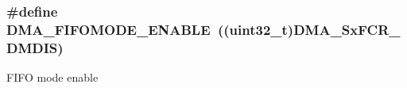 \subsubsection[{\texorpdfstring{D\+M\+A\+\_\+\+F\+I\+F\+O\+M\+O\+D\+E\+\_\+\+E\+N\+A\+B\+LE}{DMA_FIFOMODE_ENABLE}}]{\setlength{\rightskip}{0pt plus 5cm}\#define D\+M\+A\+\_\+\+F\+I\+F\+O\+M\+O\+D\+E\+\_\+\+E\+N\+A\+B\+LE~((uint32\+\_\+t)D\+M\+A\+\_\+\+Sx\+F\+C\+R\+\_\+\+D\+M\+D\+IS)}\hypertarget{group___d_m_a___f_i_f_o__direct__mode_ga18709570bed6b9112520701c482fbe4b}{}\label{group___d_m_a___f_i_f_o__direct__mode_ga18709570bed6b9112520701c482fbe4b}
F\+I\+FO mode enable 